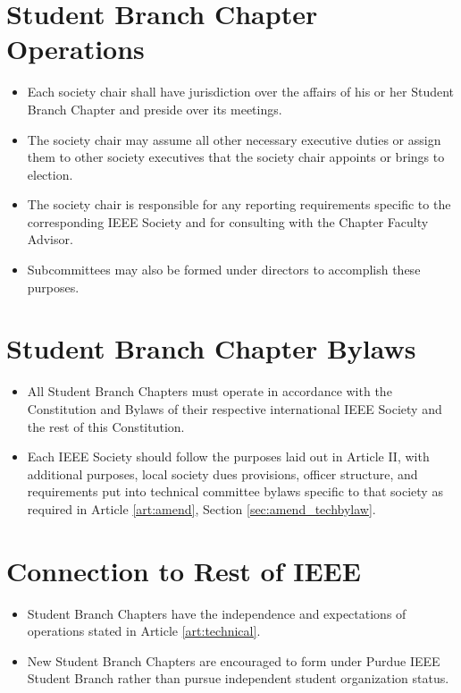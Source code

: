 \documentclass[12pt]{constitution}
\begin{document}
\section{Student Branch Chapter Operations}
\label{sec:sbc_operate}
\begin{itemize}
    \item Each society chair shall have jurisdiction over the affairs of his or her Student Branch Chapter and preside over its meetings.
    \item The society chair may assume all other necessary executive duties or assign them to other society executives that the society chair appoints or brings to election.
    \item The society chair is responsible for any reporting requirements specific to the corresponding IEEE Society and for consulting with the Chapter Faculty Advisor.
    \item Subcommittees may also be formed under directors to accomplish these purposes.
\end{itemize}

\section{Student Branch Chapter Bylaws}
\label{sec:sbc_bylaw}
\begin{itemize}
    \item All Student Branch Chapters must operate in accordance with the Constitution and Bylaws of their respective international IEEE Society and the rest of this Constitution.
    \item Each IEEE Society should follow the purposes laid out in Article II, with additional purposes, local society dues provisions, officer structure, and requirements put into technical committee bylaws specific to that society as required in Article \ref{art:amend}, Section \ref{sec:amend_techbylaw}.
\end{itemize}

\section{Connection to Rest of IEEE}
\label{sec:sbc_connect}
\begin{itemize}
    \item Student Branch Chapters have the independence and expectations of operations stated in Article \ref{art:technical}.
    \item New Student Branch Chapters are encouraged to form under Purdue IEEE Student Branch rather than pursue independent student organization status.
\end{itemize}
\end{document}
